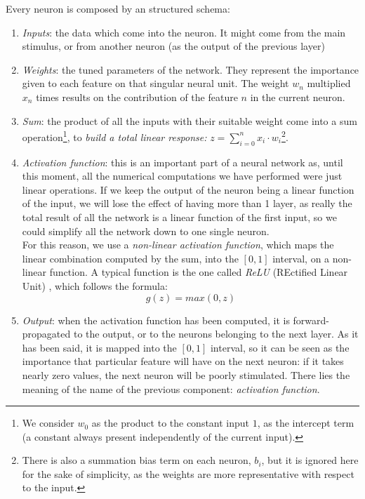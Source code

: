 Every neuron is composed by an structured schema:
\begin{enumerate}
	\item \emph{Inputs}: the data which come into the neuron. It might come from the main stimulus, or from another neuron (as the output of the previous layer)
	\item \emph{Weights}: the tuned parameters of the network. They represent the importance given to each feature on that singular neural unit. The weight $w_n$ multiplied $x_n$ times results on the contribution of the feature $n$ in the current neuron. 
	\item \emph{Sum}: the product of all the inputs with their suitable weight come into a sum operation\footnote{We consider $w_0$ as the product to the constant input $1$, as the intercept term (a constant always present independently of the current input).}, to \textit{build a total linear response:} $ z = \sum_{i=0}^{n}x_i \cdot w_i$\footnote{There is also a summation bias term on each neuron, $b_i$, but it is ignored here for the sake of simplicity, as the weights are more representative with respect to the input.}.
	\item \emph{Activation function}: this is an important part of a neural network as, until this moment, all the numerical computations we have performed were just linear operations. If we keep the output of the neuron being a linear function of the input, we will lose the effect of having more than 1 layer, as really the total result of all the network is a linear function of the first input, so we could simplify all the network down to one single neuron. \\
	
	For this reason, we use a \textit{non-linear activation function}, which maps the linear combination computed by the sum, into the $[0,1]$ interval, on a non-linear function. A typical function is the one called \emph{ReLU} (REctified Linear Unit) \cite{relu}, which follows the formula:
	\begin{equation}
		g(z) = max(0, z)
		\label{eqn:1_relu}
	\end{equation}
	
	\item \emph{Output}: when the activation function has been computed, it is forward-propagated to the output, or to the neurons belonging to the next layer. As it has been said, it is mapped into the $[0, 1]$ interval, so it can be seen as the importance that particular feature will have on the next neuron: if it takes nearly zero values, the next neuron will be poorly stimulated. There lies the meaning of the name of the previous component: \emph{activation function}.
\end{enumerate}

